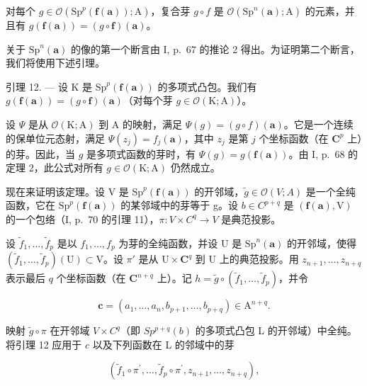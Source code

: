 对每个 \(g \in \mathcal{O}(\mathrm{Sp}^{p}(\boldsymbol{f}(\boldsymbol{a}));\mathrm{A})\)，复合芽 \(g \circ f\) 是 \(\mathcal{O}(\mathrm{Sp}^{n}(\boldsymbol{a});\mathrm{A})\) 的元素，并且有 \(g(\boldsymbol{f}(\boldsymbol{a})) = (g \circ \boldsymbol{f})(\boldsymbol{a})\)。

关于 \(\mathrm{Sp}^{n}(\boldsymbol{a})\) 的像的第一个断言由 I, p.~67 的推论 2 得出。为证明第二个断言，我们将使用下述引理。

引理 12. --- 设 K 是 \(\mathrm{Sp}^p (\pmb {f}(\pmb {a}))\) 的多项式凸包。我们有 \(g(\pmb {f}(\pmb {a})) = (g\circ \pmb {f})(\pmb {a})\)（对每个芽 \(g\in \mathcal{O}(\mathrm{K};\mathrm{A})\)）。

设 \(\Psi\) 是从 \(\mathcal{O}(\mathrm{K};\mathrm{A})\) 到 A 的映射，满足 \(\Psi(g) = (g\circ f)(\boldsymbol{a})\)。它是一个连续的保单位元态射，满足 \(\Psi(z_j) = f_j(\boldsymbol{a})\)，其中 \(z_{j}\) 是第 \(j\) 个坐标函数（在 \(\mathbf{C}^p\) 上）的芽。因此，当 \(g\) 是多项式函数的芽时，有 \(\Psi(g) = g(\boldsymbol{f}(\boldsymbol{a}))\)。由 I, p.~68 的定理 2，此公式对所有 \(g\in \mathcal{O}(\mathrm{K};\mathrm{A})\) 仍然成立。

现在来证明该定理。设 V 是 \(\mathrm{Sp}^{p}(\boldsymbol{f}(\boldsymbol{a}))\) 的开邻域，\(\widetilde{g}\in\mathcal{O}(V;A)\) 是一个全纯函数，它在 \(\mathrm{Sp}^{p}(\boldsymbol{f}(\boldsymbol{a}))\) 的某邻域中的芽等于 g。设 \(b\in C^{p+q}\) 是 \((\boldsymbol{f}(\boldsymbol{a}),\mathrm{V})\) 的一个包络（I, p.~70 的引理 11），\(\pi\colon V\times C^{q}\to V\) 是典范投影。

设 \(\widetilde{f}_1, \ldots, \widetilde{f}_p\) 是以 \(f_1, \ldots, f_p\) 为芽的全纯函数，并设 U 是 \(\mathrm{Sp}^n(\boldsymbol{a})\) 的开邻域，使得 \((\widetilde{f}_1, \ldots, \widetilde{f}_p)(\mathrm{U}) \subset \mathrm{V}\)。设 \(\pi'\) 是从 \(\mathrm{U} \times \mathbf{C}^q\) 到 U 上的典范投影。用 \(z_{n+1}, \ldots, z_{n+q}\) 表示最后 \(q\) 个坐标函数（在 \(\mathbf{C}^{n+q}\) 上）。记 \(h = \widetilde{g} \circ (\widetilde{f}_1, \ldots, \widetilde{f}_p)\)，并令

\[
\boldsymbol {c} = (a _ {1}, \dots , a _ {n}, b _ {p + 1}, \dots , b _ {p + q}) \in \mathrm{A} ^ {n + q}.
\]

映射 \(\widetilde{g} \circ \pi\) 在开邻域 \(V \times C^q\)（即 \(Sp^{p+q}(b)\) 的多项式凸包 L 的开邻域）中全纯。将引理 12 应用于 \(c\) 以及下列函数在 L 的邻域中的芽

\[
(\widetilde {f} _ {1} \circ \pi^ {\prime}, \ldots , \widetilde {f} _ {p} \circ \pi^ {\prime}, z _ {n + 1}, \ldots , z _ {n + q}),
\]


